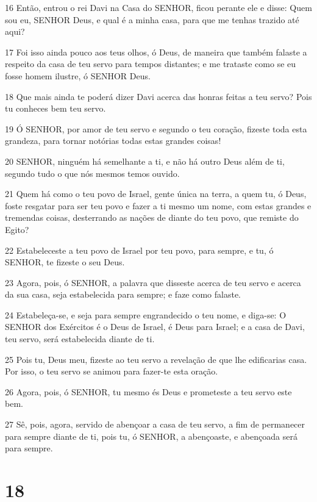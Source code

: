 \par 16 Então, entrou o rei Davi na Casa do SENHOR, ficou perante ele e disse: Quem sou eu, SENHOR Deus, e qual é a minha casa, para que me tenhas trazido até aqui?
\par 17 Foi isso ainda pouco aos teus olhos, ó Deus, de maneira que também falaste a respeito da casa de teu servo para tempos distantes; e me trataste como se eu fosse homem ilustre, ó SENHOR Deus.
\par 18 Que mais ainda te poderá dizer Davi acerca das honras feitas a teu servo? Pois tu conheces bem teu servo.
\par 19 Ó SENHOR, por amor de teu servo e segundo o teu coração, fizeste toda esta grandeza, para tornar notórias todas estas grandes coisas!
\par 20 SENHOR, ninguém há semelhante a ti, e não há outro Deus além de ti, segundo tudo o que nós mesmos temos ouvido.
\par 21 Quem há como o teu povo de Israel, gente única na terra, a quem tu, ó Deus, foste resgatar para ser teu povo e fazer a ti mesmo um nome, com estas grandes e tremendas coisas, desterrando as nações de diante do teu povo, que remiste do Egito?
\par 22 Estabeleceste a teu povo de Israel por teu povo, para sempre, e tu, ó SENHOR, te fizeste o seu Deus.
\par 23 Agora, pois, ó SENHOR, a palavra que disseste acerca de teu servo e acerca da sua casa, seja estabelecida para sempre; e faze como falaste.
\par 24 Estabeleça-se, e seja para sempre engrandecido o teu nome, e diga-se: O SENHOR dos Exércitos é o Deus de Israel, é Deus para Israel; e a casa de Davi, teu servo, será estabelecida diante de ti.
\par 25 Pois tu, Deus meu, fizeste ao teu servo a revelação de que lhe edificarias casa. Por isso, o teu servo se animou para fazer-te esta oração.
\par 26 Agora, pois, ó SENHOR, tu mesmo és Deus e prometeste a teu servo este bem.
\par 27 Sê, pois, agora, servido de abençoar a casa de teu servo, a fim de permanecer para sempre diante de ti, pois tu, ó SENHOR, a abençoaste, e abençoada será para sempre.

\chapter{18}

